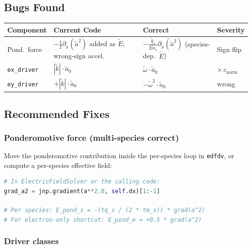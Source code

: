 \documentclass[11pt]{article}
\newcommand{\tl}[1]{\tilde{#1}}
\newcommand{\cnorm}{c_{\text{norm}}}
\newcommand{\code}[1]{\texttt{#1}}
\newcommand{\tq}{\tl{q}}
\newcommand{\tm}{\tl{m}}
\begin{document}
\subsection{Bugs Found}

\begin{center}
\renewcommand{\arraystretch}{1.5}
\begin{tabular}{lp{4.5cm}p{4.5cm}l}
\toprule
\textbf{Component} & \textbf{Current Code} & \textbf{Correct} & \textbf{Severity} \\
\midrule
Pond.\ force
& $-\frac{1}{2}\partial_{\tl{x}}(\tl{a}^2)$ added as $\tl{E}$; wrong-sign accel.
& $-\frac{\tq_s}{2\tm_s}\partial_{\tl{x}}(\tl{a}^2)$ (species-dep.\ $\tl{E}$)
& \colorbox{red!20}{Sign flip} \\[8pt]
\code{ex\_driver}
& $|\tl{k}| \cdot \tl{a}_0$
& $\tl{\omega} \cdot \tl{a}_0$
& \colorbox{red!20}{$\times\, \cnorm$} \\[4pt]
\code{ey\_driver}
& $+|\tl{k}| \cdot \tl{a}_0$
& $-\tl{\omega}^2 \cdot \tl{a}_0$
& \colorbox{red!20}{wrong} \\
\bottomrule
\end{tabular}
\end{center}

\subsection{Recommended Fixes}

\subsubsection{Ponderomotive force (multi-species correct)}

Move the ponderomotive contribution inside the per-species loop in \code{edfdv}, or compute a per-species effective field:
\begin{lstlisting}[language=Python]
# In ElectricFieldSolver or the calling code:
grad_a2 = jnp.gradient(a**2.0, self.dx)[1:-1]

# Per species: E_pond_s = -(tq_s / (2 * tm_s)) * grad(a^2)
# For electron-only shortcut: E_pond_e = +0.5 * grad(a^2)
\end{lstlisting}

\subsubsection{Driver classes}
\end{document}
